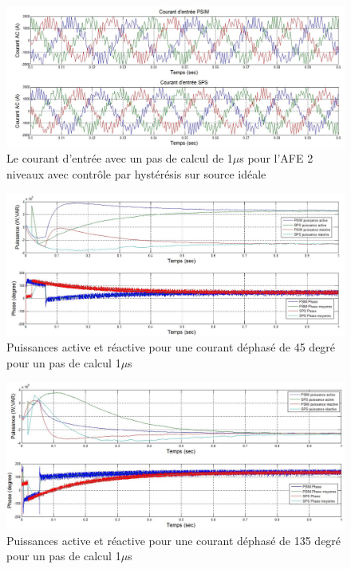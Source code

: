 \begin{figure}[htb]
\centering
\includegraphics[scale=0.5]{fig/AFEIDEAL/CourantAC.jpg}
\caption{Le courant d'entrée avec un pas de calcul de 1$\mu$s pour l'AFE 2 niveaux avec contrôle par hystérésis sur source idéale}
\label{AF_I_cou}
\end{figure}



\begin{figure}[htb]
\centering
\includegraphics[scale=0.5]{fig/AFEIDEAL/pui45.jpg}
\caption{Puissances active et réactive pour une courant déphasé de 45 degré pour un pas de calcul 1$\mu$s}
\label{AF_I_pui_45}
\end{figure}

\begin{figure}[htb]
\centering
\includegraphics[scale=0.5]{fig/AFEIDEAL/pui135.jpg}
\caption{Puissances active et réactive pour une courant déphasé de 135 degré pour un pas de calcul 1$\mu$s}
\label{AF_I_pui_135}
\end{figure}

